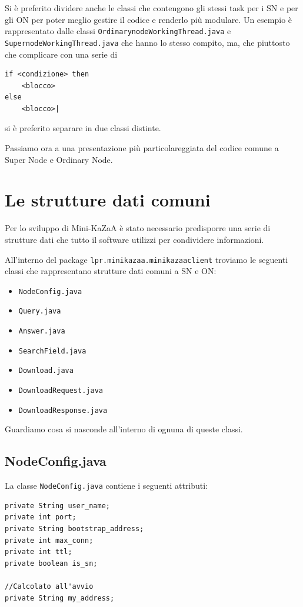Si è preferito dividere anche le classi che contengono gli stessi task per i SN e per gli ON per poter meglio gestire il codice e renderlo più modulare.
Un esempio è rappresentato dalle classi \verb|OrdinarynodeWorkingThread.java| e \verb|SupernodeWorkingThread.java| che hanno lo stesso compito, ma, che piuttosto che complicare con una serie di 
\begin{verbatim}
if <condizione> then 
	<blocco> 
else 
	<blocco>|
\end{verbatim}
si è preferito separare in due classi distinte.

Passiamo ora a una presentazione più particolareggiata del codice comune a Super Node e Ordinary Node.

\section{Le strutture dati comuni}
Per lo sviluppo di Mini-KaZaA è stato necessario predisporre una serie di strutture dati che tutto il software
utilizzi per condividere informazioni.

All'interno del package \verb|lpr.minikazaa.minikazaaclient| troviamo le seguenti classi che rappresentano strutture dati comuni a SN e ON:
\begin{itemize}
 \item \verb|NodeConfig.java|
 \item \verb|Query.java|
 \item \verb|Answer.java|
 \item \verb|SearchField.java|
 \item \verb|Download.java|
 \item \verb|DownloadRequest.java|
 \item \verb|DownloadResponse.java|
\end{itemize}

Guardiamo cosa si nasconde all'interno di ognuna di queste classi.

\subsection{NodeConfig.java}
La classe \verb|NodeConfig.java| contiene i seguenti attributi:
\newline
\begin{lstlisting}
private String user_name;
private int port;
private String bootstrap_address;
private int max_conn;
private int ttl;
private boolean is_sn;

//Calcolato all'avvio
private String my_address;
\end{lstlisting}

